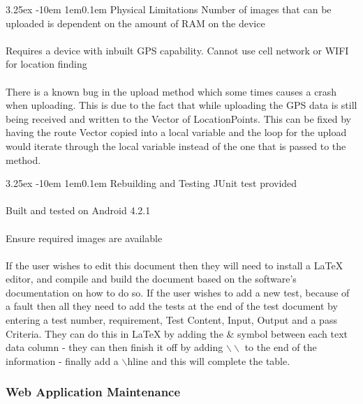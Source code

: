 \documentclass[12pt]{article}
\makeatletter
\renewcommand{\paragraph}{
  \@startsection{paragraph}{4}
  {\z@}{3.25ex \@plus -10em \@minus 1em}{0.1em}
  {\normalfont\normalsize\bfseries}
}
\makeatother
\begin{document}
\paragraph{Physical Limitations}
Number of images that can be uploaded is dependent on the amount of RAM on the device
\\\\
Requires a device with inbuilt GPS capability. Cannot use cell network or WIFI for location finding
\\\\
There is a known bug in the upload method which some times causes a crash when uploading. This is due to the fact that while uploading the GPS data is still being received and written to the Vector of LocationPoints. This can be fixed by having the route Vector copied into a local variable and the loop for the upload would iterate through the local variable instead of the one that is passed to the method.
\paragraph{Rebuilding and Testing}
JUnit test provided
\\\\
Built and tested on Android 4.2.1
\\\\
Ensure required images are available
\\\\
 If the user wishes to edit this document then they will need to install a LaTeX editor,  and compile and build the document based on the software's documentation on how to do so. If the user wishes to add a new test, because of a fault then all they need to add the tests at the end of the test document by entering a test number, requirement, Test Content, Input, Output and a pass Criteria. They can do this in LaTeX by adding the \& symbol between each text data column - they can then finish it off by adding $\backslash \backslash$ to the end of the information - finally add a $\backslash$hline and this will complete the table.
\newpage

\subsubsection{Web Application Maintenance}
\end{document}
